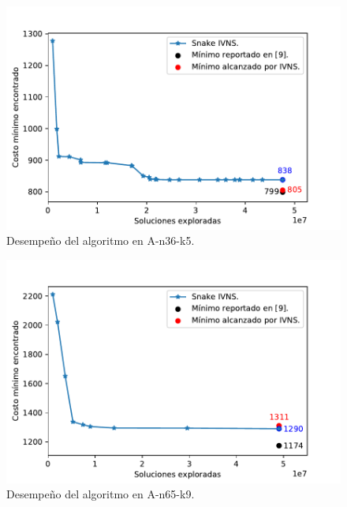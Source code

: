 \documentclass[a4paper,10pt,twocolumn]{article}
\begin{document}
	\begin{figure}[H]
		\centering
		\includegraphics[scale=.55]{Graphics/result_A-n36-k5.pdf}
		\caption{Desempeño del algoritmo en A-n36-k5.}\label{fig:result36_5}
	\end{figure}
	
	\begin{figure}[htbp]
		\centering
		\includegraphics[scale=.55]{Graphics/result_A-n65-k9.pdf}
		\caption{Desempeño del algoritmo en A-n65-k9.}\label{fig:result65_9}
	\end{figure}
	
\end{document}
